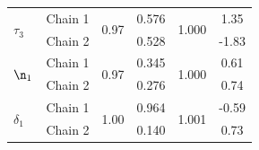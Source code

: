 \begin{table}[H]
\begin{tabular}{lccccc}
\multirow{2}{*}{$\tau_3$} & Chain 1 & \multirow{2}{*}{0.97} & 0.576 & \multirow{2}{*}{1.000} & 1.35 \\
 & Chain 2 & & 0.528 & & -1.83 \\
\midrule
\multirow{2}{*}{$\n_1$} & Chain 1 & \multirow{2}{*}{0.97} & 0.345 & \multirow{2}{*}{1.000} & 0.61 \\
 & Chain 2 & & 0.276 & & 0.74 \\
\midrule
\multirow{2}{*}{$\delta_1$} & Chain 1 & \multirow{2}{*}{1.00} & 0.964 & \multirow{2}{*}{1.001} & -0.59 \\
 & Chain 2 & & 0.140 & & 0.73 \\
\bottomrule
\end{tabular}
\end{table}
